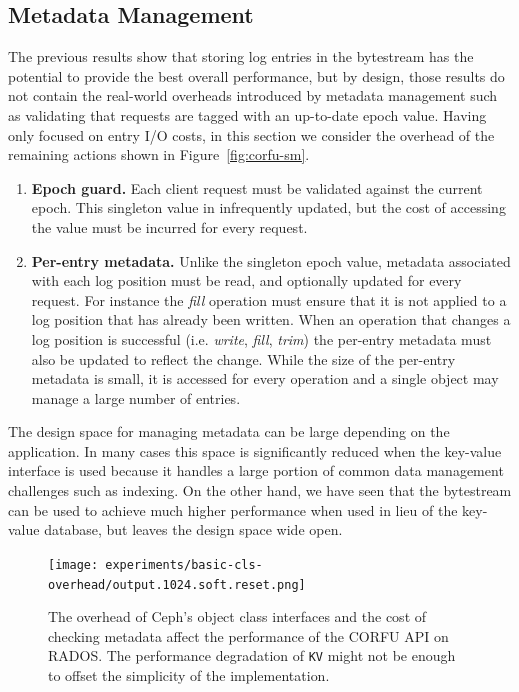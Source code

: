 \documentclass[10pt,twocolumn]{article}
\begin{document}
\subsection{Metadata Management}
\label{sec:mm}

The previous results show that storing log entries in the bytestream has the
potential to provide the best overall performance, but by design, those
results do not contain the real-world overheads introduced by metadata
management such as validating that requests are tagged with an up-to-date
epoch value. Having only focused on entry I/O costs, in this section we
consider the overhead of the remaining actions shown in
Figure~\ref{fig:corfu-sm}.

\begin{enumerate}
    \item {\bf Epoch guard.} Each client request must be validated against the
        current epoch. This singleton value in infrequently updated, but the
        cost of accessing the value must be incurred for every request.

    \item {\bf Per-entry metadata.} Unlike the singleton epoch value, metadata
        associated with each log position must be read, and optionally updated
        for every request. For instance the \emph{fill} operation must ensure
        that it is not applied to a log position that has already been
        written. When an operation that changes a log position is successful
        (i.e. \emph{write}, \emph{fill}, \emph{trim}) the per-entry metadata
        must also be updated to reflect the change. While the size of the
        per-entry metadata is small, it is accessed for every operation and a
        single object may manage a large number of entries.
\end{enumerate}

The design space for managing metadata can be large depending on the
application. In many cases this space is significantly reduced when the
key-value interface is used because it handles a large portion of common data
management challenges such as indexing. On the other hand, we have seen that
the bytestream can be used to achieve much higher performance when used in
lieu of the key-value database, but leaves the design space wide open.

\begin{figure}[t]
	\centering
	\texttt{[image: experiments/basic-cls-overhead/output.1024.soft.reset.png]}	
	\caption{The overhead of Ceph's object class interfaces and the cost of checking metadata affect the performance of the CORFU API on RADOS. The performance degradation of \texttt{KV} might not be enough to offset the simplicity of the implementation.}
	\label{fig:cls_wr_jewel}
\end{figure}
\end{document}

